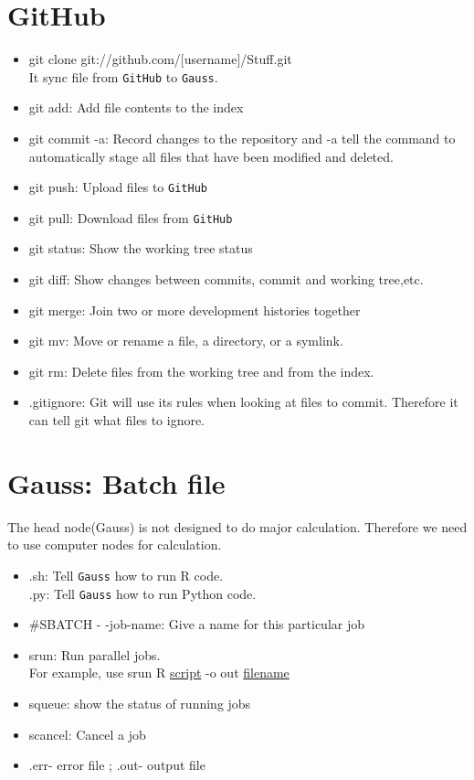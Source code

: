 \documentclass[10pt]{article}
\begin{document}
\section{GitHub}
\begin{itemize}
\item \textsf{git clone git://github.com/[username]/Stuff.git} \\
  It sync file from \verb"GitHub" to \verb"Gauss".
\item \textsf{git add}: Add file contents to the index
\item \textsf{git commit -a}: Record changes to the repository and \textsf{-a} tell the command to automatically stage all files that have been modified and deleted.
\item \textsf{git push}: Upload files to \verb"GitHub" 
\item \textsf{git pull}: Download files from \verb"GitHub" 
\item \textsf{git status}: Show the working tree status
\item \textsf{git diff}: Show changes between commits, commit and working tree,etc.
\item \textsf{git merge}: Join two or more development histories together
\item \textsf{git mv}: Move or rename a file, a directory, or a symlink.
\item \textsf{git rm}: Delete files from the working tree and from the index.
\item \textsf{.gitignore}: Git will use its rules when looking at files to commit. Therefore it can tell git what files to ignore.
\end{itemize} 

\section{Gauss: Batch file}
The head node(Gauss) is not designed to do major calculation. Therefore we need to use computer nodes for calculation.
\begin{itemize}
\item \textsf{.sh}: Tell \verb"Gauss" how to run R code. \\
      \textsf{.py}: Tell \verb"Gauss" how to run Python code. 
\item \textsf{\#SBATCH - -job-name}: Give a name for this particular job
\item \textsf{srun}: Run parallel jobs. \\
  For example, use srun \textsf{R \underline{script} -o out \underline{filename}}
\item \textsf{squeue}: show the status of running jobs
\item \textsf{scancel}:	Cancel a job
\item \textsf{.err}- error file ; \textsf{.out}- output file
\end{itemize} 
\end{document}
